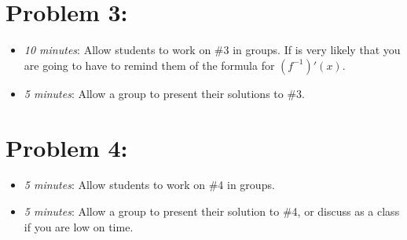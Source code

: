 \documentclass[handout,nooutcomes]{ximera}
\begin{document}
	
	
\section*{Problem 3:}

	\begin{itemize}
	
	\item  \emph{10 minutes}:  Allow students to work on \#3 in groups.  If is very likely that you are going to have to remind them of the formula for $(f^{-1})'(x)$. 
	
	\item  \emph{5 minutes}:  Allow a group to present their solutions to \#3.
	
	\end{itemize}
	


\section*{Problem 4:}

	\begin{itemize}
	
	\item  \emph{5 minutes}:  Allow students to work on \#4 in groups.  
	
	\item  \emph{5 minutes}:  Allow a group to present their solution to \#4, or discuss as a class if you are low on time.
		
	\end{itemize}	
	
	
	

	
	

	
	
	

	
	
	
\end{document}
